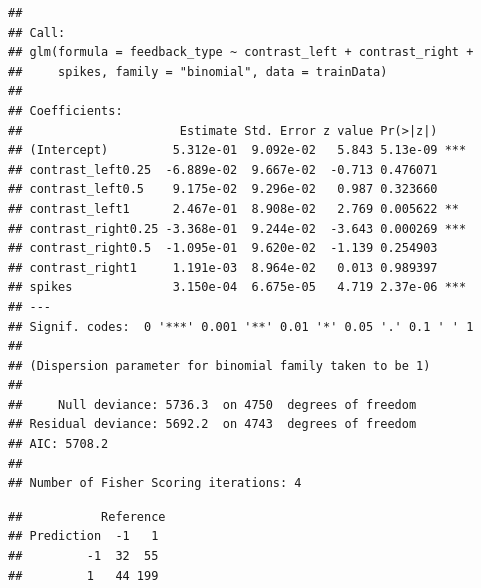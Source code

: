 \documentclass[
]{article}
\newenvironment{Shaded}{\begin{snugshade}}{\end{snugshade}}
\newcommand{\DecValTok}[1]{\textcolor[rgb]{0.00,0.00,0.81}{#1}}
\newcommand{\DocumentationTok}[1]{\textcolor[rgb]{0.56,0.35,0.01}{\textbf{\textit{#1}}}}
\newcommand{\FloatTok}[1]{\textcolor[rgb]{0.00,0.00,0.81}{#1}}
\newcommand{\FunctionTok}[1]{\textcolor[rgb]{0.13,0.29,0.53}{\textbf{#1}}}
\newcommand{\NormalTok}[1]{#1}
\newcommand{\OtherTok}[1]{\textcolor[rgb]{0.56,0.35,0.01}{#1}}
\newcommand{\SpecialCharTok}[1]{\textcolor[rgb]{0.81,0.36,0.00}{\textbf{#1}}}
\begin{document}
\begin{verbatim}
## 
## Call:
## glm(formula = feedback_type ~ contrast_left + contrast_right + 
##     spikes, family = "binomial", data = trainData)
## 
## Coefficients:
##                      Estimate Std. Error z value Pr(>|z|)    
## (Intercept)         5.312e-01  9.092e-02   5.843 5.13e-09 ***
## contrast_left0.25  -6.889e-02  9.667e-02  -0.713 0.476071    
## contrast_left0.5    9.175e-02  9.296e-02   0.987 0.323660    
## contrast_left1      2.467e-01  8.908e-02   2.769 0.005622 ** 
## contrast_right0.25 -3.368e-01  9.244e-02  -3.643 0.000269 ***
## contrast_right0.5  -1.095e-01  9.620e-02  -1.139 0.254903    
## contrast_right1     1.191e-03  8.964e-02   0.013 0.989397    
## spikes              3.150e-04  6.675e-05   4.719 2.37e-06 ***
## ---
## Signif. codes:  0 '***' 0.001 '**' 0.01 '*' 0.05 '.' 0.1 ' ' 1
## 
## (Dispersion parameter for binomial family taken to be 1)
## 
##     Null deviance: 5736.3  on 4750  degrees of freedom
## Residual deviance: 5692.2  on 4743  degrees of freedom
## AIC: 5708.2
## 
## Number of Fisher Scoring iterations: 4
\end{verbatim}

\begin{Shaded}
\end{Shaded}

\begin{verbatim}
##           Reference
## Prediction  -1   1
##         -1  32  55
##         1   44 199
\end{verbatim}

\begin{Shaded}
\end{Shaded}
\end{document}
